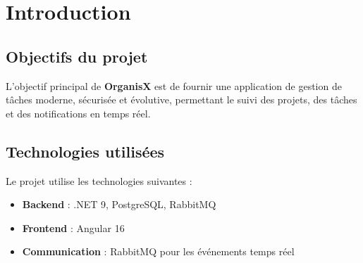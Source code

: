 \chapter{Introduction}

\section{Objectifs du projet}
L'objectif principal de \textbf{OrganisX} est de fournir une application de gestion de tâches moderne, sécurisée et évolutive, permettant le suivi des projets, des tâches et des notifications en temps réel.

\section{Technologies utilisées}
Le projet utilise les technologies suivantes :
\begin{itemize}
	\item \textbf{Backend} : .NET 9, PostgreSQL, RabbitMQ
	\item \textbf{Frontend} : Angular 16
	\item \textbf{Communication} : RabbitMQ pour les événements temps réel
\end{itemize}
